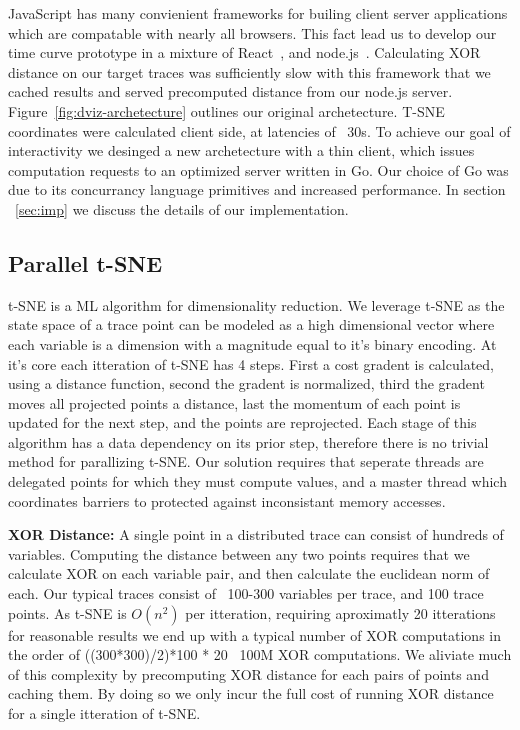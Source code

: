 JavaScript has many convienient frameworks for builing client server
applications which are compatable with nearly all browsers. This fact lead us
to develop our time curve prototype in a mixture of React~\cite{react}, and
node.js~\cite{nodejs}. Calculating XOR distance on our target traces was
sufficiently slow with this framework that we cached results and served
precomputed distance from our node.js server. Figure~\ref{fig:dviz-archetecture} outlines our original archetecture. T-SNE coordinates
were calculated client side, at latencies of ~30s. To achieve our goal of
interactivity we desinged a new archetecture with a thin client, which issues
computation requests to an optimized server written in Go. Our choice of Go was
due to its concurrancy language primitives and increased performance. In
section ~\ref{sec:imp} we discuss the details of our implementation.

\subsection{Parallel t-SNE}
\label{sec:ptsne}
t-SNE is a ML algorithm for dimensionality reduction. We leverage t-SNE as the
state space of a trace point can be modeled as a high dimensional vector where
each variable is a dimension with a magnitude equal to it's binary encoding. At
it's core each itteration of t-SNE has 4 steps. First a cost gradent is
calculated, using a distance function, second the gradent is normalized, third
the gradent moves all projected points a distance, last the momentum of each
point is updated for the next step, and the points are reprojected. Each stage
of this algorithm has a data dependency on its prior step, therefore there is
no trivial method for parallizing t-SNE. Our solution requires that seperate
threads are delegated points for which they must compute values, and a master
thread which coordinates barriers to protected against inconsistant memory
accesses.



\noindent\textbf{XOR Distance:} A single point in a distributed trace can
consist of hundreds of variables.  Computing the distance between any
two points requires that we calculate XOR on each variable pair, and
then calculate the euclidean norm of each. Our typical traces consist
of ~100-300 variables per trace, and 100 trace points. As t-SNE is
$O(n^2)$ per itteration, requiring aproximatly 20 itterations for
reasonable results we end up with a typical number of XOR computations
in the order of ((300*300)/2)*100 * 20 ~100M XOR computations. We
aliviate much of this complexity by precomputing XOR distance for each
pairs of points and caching them. By doing so we only incur the full
cost of running XOR distance for a single itteration of t-SNE.



